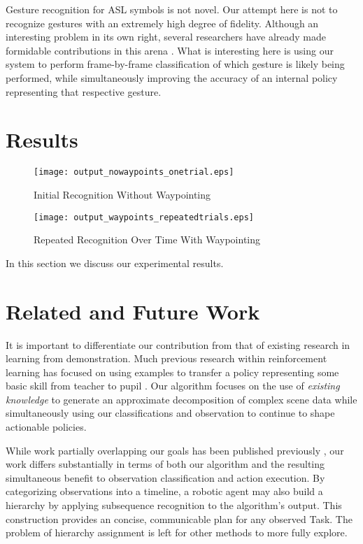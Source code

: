 \documentclass[letterpaper]{article}
\begin{document}
Gesture recognition for ASL symbols is not novel.  Our attempt here is not to recognize gestures with an extremely high degree of fidelity.  Although an interesting problem in its own right, several researchers have already made formidable contributions in this arena \cite{HandGestures,HSMMRecognition,POMDPGesture,HoughASL,ASLRealTime,MotionASL}.  What is interesting here is using our system to perform frame-by-frame classification of which gesture is likely being performed, while simultaneously improving the accuracy of an internal policy representing that respective gesture.

\section{Results}
\label{sec:result}

\begin{figure}
\begin{center}
\texttt{[image: output\_nowaypoints\_onetrial.eps]}
\caption{Initial Recognition Without Waypointing}
\label{fig:output_nowaypoints_onetrial}
\end{center}
\end{figure}

\begin{figure}
\begin{center}
\texttt{[image: output\_waypoints\_repeatedtrials.eps]}
\caption{Repeated Recognition Over Time With Waypointing}
\label{fig:output_nowaypoints_repeatedtrials}
\end{center}
\end{figure}

In this section we discuss our experimental results.

\section{Related and Future Work}
\label{sec:future}
It is important to differentiate our contribution from that of
existing research in learning from demonstration.  Much previous research
within reinforcement learning has focused on using examples to
transfer a policy representing some basic skill from teacher to
pupil \cite{JenkinsLFD,LFDSurvey}.  Our algorithm focuses on the use of
\textit{existing knowledge} to generate an approximate decomposition of
complex scene data while simultaneously using our classifications and 
observation to continue to shape actionable policies.

While work partially overlapping our goals has been published previously
\cite{LearningBehaviorFusion}, our work differs substantially in terms of both
our algorithm and the resulting simultaneous benefit to observation
classification and action execution. By categorizing observations into a timeline, a robotic agent may also build a hierarchy by applying subsequence recognition to the algorithm's output. This construction provides an concise, communicable plan for any observed Task. The problem of hierarchy assignment is left for other methods to more fully explore.
\end{document}
